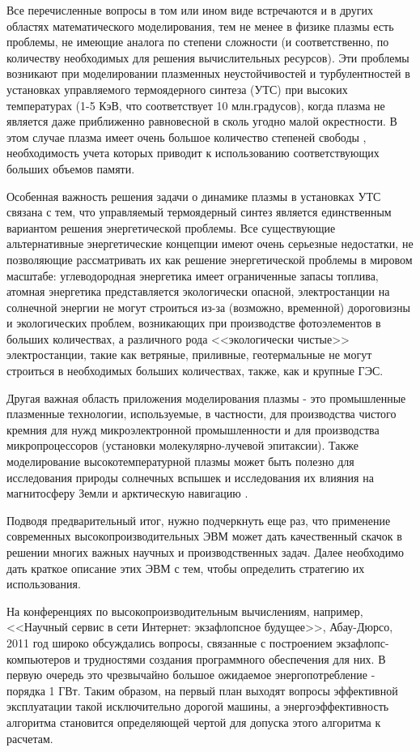Все перечисленные вопросы в том или ином виде встречаются и в других областях математического моделирования, тем не менее в физике плазмы есть проблемы, не имеющие аналога по степени сложности (и соответственно, по количеству необходимых для решения вычислительных ресурсов). Эти проблемы возникают при моделировании плазменных неустойчивостей и турбулентностей в установках управляемого термоядерного синтеза (УТС) при высоких температурах (1-5 КэВ, что соответствует 10 млн.градусов), когда плазма не является даже приближенно равновесной в сколь угодно малой окрестности. В этом случае плазма имеет очень большое количество степеней свободы \cite{MohographyKhoroshevsky}, необходимость учета которых приводит к использованию соответствующих больших объемов памяти.

Особенная важность решения задачи о динамике плазмы в установках УТС связана с тем, что управляемый термоядерный синтез является единственным вариантом решения энергетической проблемы. Все существующие альтернативные энергетические концепции имеют очень серьезные недостатки, не позволяющие рассматривать их как решение энергетической проблемы в мировом масштабе: углеводородная энергетика имеет ограниченные запасы топлива, атомная энергетика представляется экологически опасной, электростанции на солнечной энергии не могут строиться из-за (возможно, временной) дороговизны и экологических проблем, возникающих при производстве фотоэлементов в больших количествах, а различного рода <<экологически чистые>> электростанции, такие как ветряные, приливные, геотермальные не могут строиться в необходимых больших количествах, также, как и крупные ГЭС.

Другая важная область приложения моделирования плазмы - это промышленные плазменные технологии, используемые, в частности, для производства чистого кремния для нужд микроэлектронной промышленности и для производства микропроцессоров (установки молекулярно-лучевой эпитаксии). Также моделирование высокотемпературной плазмы может быть полезно для исследования природы солнечных вспышек и исследования их влияния на магнитосферу Земли и арктическую навигацию \cite{RussellIEEE}.
	
Подводя предварительный итог, нужно подчеркнуть еще раз, что применение современных высокопроизводительных ЭВМ может дать качественный скачок в решении многих важных научных и производственных задач. Далее необходимо дать краткое описание этих ЭВМ с тем, чтобы определить стратегию их использования. 

На конференциях по высокопроизводительным вычислениям, например, <<Научный сервис в сети Интернет: экзафлопсное будущее>>, Абау-Дюрсо, 2011 год широко обсуждались вопросы, связанные с построением экзафлопс-компьютеров и трудностями создания программного обеспечения для них. 
В первую очередь это чрезвычайно большое ожидаемое энергопотребление - порядка 1 ГВт. Таким образом, на первый план выходят вопросы эффективной эксплуатации такой исключительно дорогой машины, а энергоэффективность алгоритма становится определяющей чертой для допуска этого алгоритма к расчетам.

